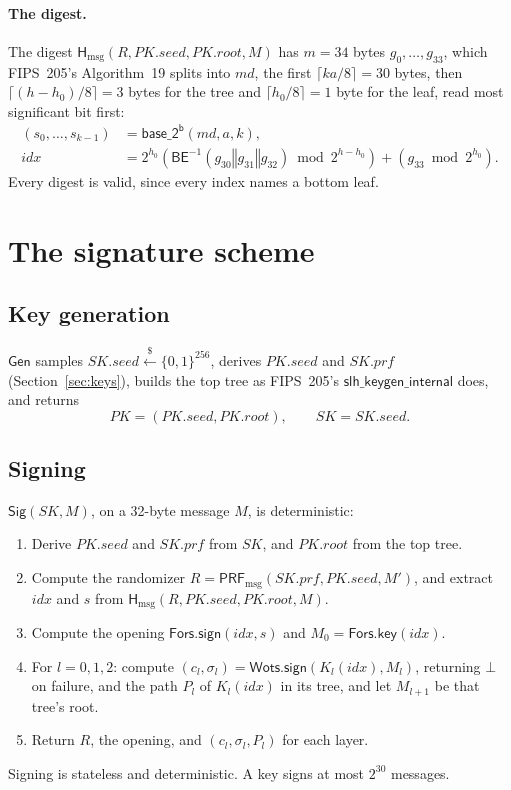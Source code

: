 \documentclass[11pt]{article}
\newcommand{\bits}[1]{\{0,1\}^{#1}}
\newcommand{\getsr}{\stackrel{\$}{\gets}}
\newcommand{\PRFmsg}{\mathsf{PRF}_{\mathrm{msg}}}
\newcommand{\Hmsg}{\mathsf{H}_{\mathrm{msg}}}
\newcommand{\Gen}{\mathsf{Gen}}
\newcommand{\Sig}{\mathsf{Sig}}
\newcommand{\BE}{\mathsf{BE}}
\newcommand{\basetwo}{\mathsf{base\_2^b}}
\newcommand{\concat}{\mathbin\Vert}
\newcommand{\PK}{\mathit{PK}}
\newcommand{\SK}{\mathit{SK}}
\newcommand{\pkseed}{\mathit{PK.seed}}
\newcommand{\pkroot}{\mathit{PK.root}}
\newcommand{\skseed}{\mathit{SK.seed}}
\newcommand{\skprf}{\mathit{SK.prf}}
\newcommand{\idx}{\mathit{idx}}
\newcommand{\WotsSign}{\mathsf{Wots.sign}}
\newcommand{\ForsKey}{\mathsf{Fors.key}}
\newcommand{\ForsSign}{\mathsf{Fors.sign}}
\begin{document}
\paragraph{The digest.}
The digest $\Hmsg(R,\pkseed,\pkroot,M)$ has $m=34$ bytes $g_0,\ldots,g_{33}$, which FIPS~205's Algorithm~19 splits into $\mathit{md}$, the first $\lceil ka/8\rceil=30$ bytes, then $\lceil(h-h_0)/8\rceil=3$ bytes for the tree and $\lceil h_0/8\rceil=1$ byte for the leaf, read most significant bit first:
\[
\begin{aligned}
  (s_0,\ldots,s_{k-1})&=\basetwo(\mathit{md},a,k),\\
  \idx&=2^{h_0}\left(\BE^{-1}(g_{30}\concat g_{31}\concat g_{32})\bmod2^{h-h_0}\right)+\left(g_{33}\bmod2^{h_0}\right).
\end{aligned}
\]
Every digest is valid, since every index names a bottom leaf.

\section{The signature scheme}
\label{sec:scheme}

\subsection{Key generation}

$\Gen$ samples $\skseed\getsr\bits{256}$, derives $\pkseed$ and $\skprf$ (Section~\ref{sec:keys}), builds the top tree as FIPS~205's $\mathsf{slh\_keygen\_internal}$ does, and returns
\[
  \PK=(\pkseed,\pkroot),\qquad \SK=\skseed.
\]

\subsection{Signing}

$\Sig(\SK,M)$, on a 32-byte message $M$, is deterministic:
\begin{enumerate}
\item Derive $\pkseed$ and $\skprf$ from $\SK$, and $\pkroot$ from the top tree.
\item Compute the randomizer $R=\PRFmsg(\skprf,\pkseed,M')$, and extract $\idx$ and $s$ from $\Hmsg(R,\pkseed,\pkroot,M)$.
\item Compute the opening $\ForsSign(\idx,s)$ and $M_0=\ForsKey(\idx)$.
\item For $l=0,1,2$: compute $(c_l,\sigma_l)=\WotsSign(K_l(\idx),M_l)$, returning $\bot$ on failure, and the path $P_l$ of $K_l(\idx)$ in its tree, and let $M_{l+1}$ be that tree's root.
\item Return $R$, the opening, and $(c_l,\sigma_l,P_l)$ for each layer.
\end{enumerate}
Signing is stateless and deterministic. A key signs at most $2^{30}$ messages.
\end{document}
